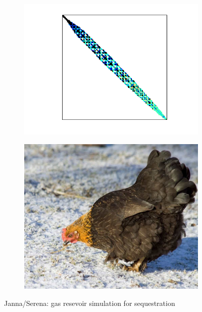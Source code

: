 \documentclass[t,12pt,numbers,fleqn]{beamer}
\begin{document}
\begin{frame}
\begin{figure}[h]
  \centering
  \begin{subfigure}[b]{0.5\textwidth}
    \centering
    \includegraphics[width=\textwidth,trim={2cm 1.5cm 2cm 1cm},clip]{figures/Serena}
  \end{subfigure}
  \begin{subfigure}[b]{0.4\textwidth}
    \centering
    \includegraphics[width=\textwidth]{figures/chicken}
  \end{subfigure}
  \caption*{Janna/Serena: gas resevoir simulation for 
    sequestration}
  \label{fig:Serena}
\end{figure}

\end{frame}
\end{document}
